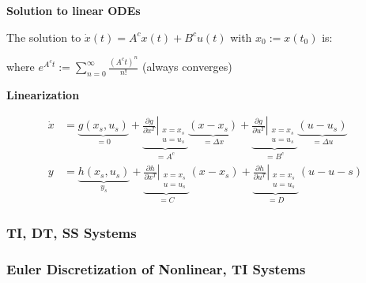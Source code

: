 \documentclass[8pt,a4paper]{scrartcl}
\begin{document}
\begin{multicols*}{3}
\textbf{Solution to linear ODEs}

The solution to $\dot{x}(t)=A^cx(t)+B^cu(t)$ with $x_0:=x(t_0)$ is:


where $e^{A^ct}:=\sum\limits_{n=0}^\infty\frac{(A^ct)^n}{n!}$ (always converges)

\textbf{Linearization}


\small
\begin{align*}
\dot{x}&=\underbrace{g(x_s,u_s)}_{=0}+\underbrace{\left.\frac{\partial g}{\partial x^T}\right|_{\substack{x=x_s\\u=u_s}}}_{=A^c}\underbrace{(x-x_s)}_{=\Delta x}+\underbrace{\left.\frac{\partial g}{\partial u^T}\right|_{\substack{x=x_s\\u=u_s}}}_{=B^c}\underbrace{(u-u_s)}_{=\Delta u}\\
y&=\underbrace{h(x_s,u_s)}_{y_s}+\underbrace{\left.\frac{\partial h}{\partial x^T}\right|_{\substack{x=x_s\\u=u_s}}}_{=C}(x-x_s)+\underbrace{\left.\frac{\partial h}{\partial u^T}\right|_{\substack{x=x_s\\u=u_s}}}_{=D}(u-u-s)
\end{align*}
\normalsize

\subsubsection{TI, DT, SS Systems}




\subsubsection{Euler Discretization of Nonlinear, TI Systems}


\end{multicols*}
\end{document}
